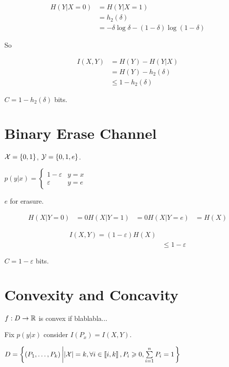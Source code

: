 \[
    \begin{aligned}
        H(Y \vert X=0) &= H(Y \vert X=1)\\
        &= h_2(\delta)\\
        &= -\delta \log \delta - (1-\delta) \log (1-\delta)
    \end{aligned}
\]

So

\[
    \begin{aligned}
        I(X,Y) &= H(Y) - H(Y\vert X)\\
        &= H(Y) - h_2(\delta)\\
        &\leqslant 1 - h_2(\delta)
    \end{aligned}
\]

$C = 1-h_2(\delta)$ bits.

\section{Binary Erase Channel}

$\mathcal{X} = \left\{ 0,1 \right\}$, $\mathcal{Y}= \left\{ 0,1,e \right\}$.

$p(y\vert x) = \begin{cases}
    1-\varepsilon & y=x\\
    \varepsilon & y=e
\end{cases}$

$e$ for erasure.

\[
    \begin{aligned}
        H(X \vert Y = 0) &= 0
        H(X \vert Y = 1) &= 0
        H(X \vert Y = e) &= H(X)
    \end{aligned}
\]

\[
    \begin{aligned}
        I(X,Y) = (1-\varepsilon) H(X)\\
        &\leqslant 1-\varepsilon
    \end{aligned}
\]

$C = 1-\varepsilon$ bits.

\section{Convexity and Concavity}

$f : D \to \mathbb{R}$ is convex if blablabla...

Fix $p(y\vert x)$ consider $I(P_x) = I(X,Y) $. 

$D = \left\{ (P_1,\ldots,P_k) \left\vert \left\lvert\mathcal{X}\right\rvert = k, \forall i\in\left\llbracket i,k \right\rrbracket, P_i\geqslant 0, \sum\limits_{i=1}^n P_i = 1\right. \right\}$

